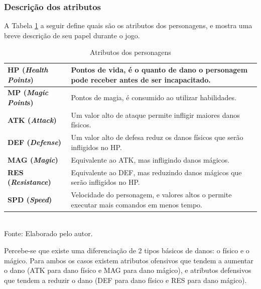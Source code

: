 \documentclass[12pt,a4paper]{article}
\newcommand{\source}[1]{\small Fonte: {#1}}
\begin{document}
	\subsubsection{Descrição dos atributos}
	A Tabela \ref{tab:characterStats} a seguir define quais são os atributos dos personagens,
	e mostra uma breve descrição de seu papel durante o jogo.
	
	\begin{table}[h]
		\caption{Atributos dos personagens}
		\centering
		\small
		\renewcommand{\arraystretch}{1.2} %
		\begin{tabular}{>{\centering\arraybackslash}m{3.5cm} m{11.5cm}}
			\hline 
			\textbf{HP (\textit{Health Points})} & Pontos de vida, é o quanto de dano o personagem pode receber antes de ser incapacitado. \\ 
			\hline 
			\textbf{MP (\textit{Magic Point}s)} & Pontos de magia, é consumido ao utilizar habilidades. \\ 
			\hline 
			\textbf{ATK (\textit{Attack})} & Um valor alto de ataque permite infligir maiores danos físicos. \\ 
			\hline 
			\textbf{DEF (\textit{Defense})} & Um valor alto de defesa reduz os danos físicos que serão infligidos no HP. \\ 
			\hline 
			\textbf{MAG (\textit{Magic})} & Equivalente ao ATK, mas infligindo danos mágicos. \\ 
			\hline 
			\textbf{RES (\textit{Resistance})} & Equivalente ao DEF, mas reduzindo danos mágicos que serão infligidos no HP. \\ 
			\hline 
			\textbf{SPD (\textit{Speed})} & Velocidade do personagem, e valores altos o permite executar mais comandos em menos tempo. \\ 
			\hline 
		\end{tabular}\\
		\vspace{3mm}
		\source{Elaborado pelo autor.}
		\label{tab:characterStats}
	\end{table}
	
	Percebe-se que existe uma diferenciação de 2 tipos básicos de danos:
	o físico e o mágico.
	Para ambos os casos
	existem atributos ofensivos que tendem a aumentar o dano (ATK para dano físico e MAG para dano mágico),
	e atributos defensivos que tendem a reduzir o dano (DEF para dano físico e RES para dano mágico).
	
\end{document}
